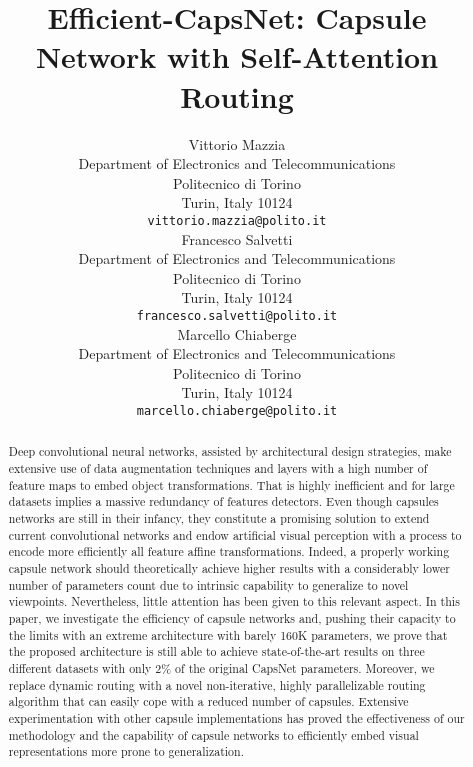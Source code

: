 \documentclass{article}
\title{Efficient-CapsNet: Capsule Network with Self-Attention Routing}
\author{
 Vittorio Mazzia \\
  Department of Electronics and Telecommunications\\
  Politecnico di Torino\\
  Turin, Italy 10124\\
  \texttt{vittorio.mazzia@polito.it} \\
\And
 Francesco Salvetti \\
  Department of Electronics and Telecommunications\\
  Politecnico di Torino\\
  Turin, Italy 10124 \\
  \texttt{francesco.salvetti@polito.it} \\
  \And
  Marcello Chiaberge \\
  Department of Electronics and Telecommunications\\
  Politecnico di Torino\\
  Turin, Italy 10124 \\
  \texttt{marcello.chiaberge@polito.it} \\
}
\begin{document}
\maketitle
\begin{abstract}
Deep convolutional neural networks, assisted by architectural design strategies, make extensive use of data augmentation techniques and layers with a high number of feature maps to embed object transformations. That is highly inefficient and for large datasets implies a massive redundancy of features detectors. Even though capsules networks are still in their infancy, they constitute a promising solution to extend current convolutional networks and endow artificial visual perception with a process to encode more efficiently all feature affine transformations. Indeed, a properly working capsule network should theoretically achieve higher results with a considerably lower number of parameters count due to intrinsic capability to generalize to novel viewpoints. Nevertheless, little attention has been given to this relevant aspect. In this paper, we investigate the efficiency of capsule networks and, pushing their capacity to the limits with an extreme architecture with barely 160K parameters, we prove that the proposed architecture is still able to achieve state-of-the-art results on three different datasets with only 2\% of the original CapsNet parameters. Moreover, we replace dynamic routing with a novel non-iterative, highly parallelizable routing algorithm that can easily cope with a reduced number of capsules. Extensive experimentation with other capsule implementations has proved the effectiveness of our methodology and the capability of capsule networks to efficiently embed visual representations more prone to generalization.
\end{abstract}
\end{document}
